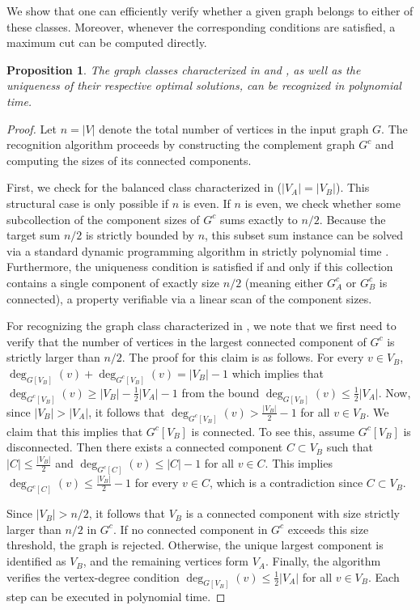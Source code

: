 \documentclass[a4paper,fleqn]{cas-sc}
\newcommand{\1}{\mathbf{1}}
\newtheorem{proposition}[theorem]{Proposition}
\begin{document}
We show that one can efficiently verify whether a given graph belongs to either of these classes. Moreover, whenever the corresponding conditions are satisfied, a maximum cut can be computed directly.


\begin{proposition}
The graph classes characterized in  and , as well as the uniqueness of their respective optimal solutions, can be recognized in polynomial time.
\end{proposition}

\begin{proof}
Let $n = |V|$ denote the total number of vertices in the input graph $G$. The recognition algorithm proceeds by constructing the complement graph $G^c$ and computing the sizes of its connected components.

First, we check for the balanced class characterized in  ($|V_A| = |V_B|$). This structural case is only possible if $n$ is even. If $n$ is even, we check whether some subcollection of the component sizes of $G^c$ sums exactly to $n/2$. Because the target sum $n/2$ is strictly bounded by $n$, this subset sum instance can be solved via a standard dynamic programming algorithm in strictly polynomial time \cite{MIT6006Lec18}. Furthermore, the uniqueness condition is satisfied if and only if this collection contains a single component of exactly size $n/2$ (meaning either $G_A^c$ or $G_B^c$ is connected), a property verifiable via a linear scan of the component sizes.

For recognizing the graph class characterized in , we note that we first need to verify that the number of vertices in the largest connected component of $G^c$ is strictly larger than $n/2$. The proof for this claim is as follows. For every $v \in V_B$, $\deg_{G[V_B]}(v) + \deg_{G^c[V_B]}(v) = |V_B| - 1$ which implies that $\deg_{G^c[V_B]}(v) \geq |V_B|- \frac{1}{2}|V_A|- 1$ from the bound $\deg_{G[V_B]} (v) \leq \tfrac{1}{2}|V_A|$. Now, since $|V_B| > |V_A|$, it follows that $ \deg_{G^c[V_B]}(v) > \frac{|V_B|}{2}-1$ for all $v \in V_B$. We claim that this implies that $G^c[V_B]$ is connected. To see this, assume $G^c[V_B]$ is disconnected. Then there exists a connected component $C \subset V_B$ such that $|C| \leq \frac{|V_B|}{2}$ and $\deg_{G^c[C]} (v) \leq |C| -1$ for all $v \in C$. This implies $\deg_{G^c[C]}(v) \leq \frac{|V_B|}{2}-1$ for every $v \in C$, which is a contradiction since $C \subset V_B$. 

Since $|V_B| > n/2$, it follows that $V_B$ is a connected component with size strictly larger than $n/2$ in $G^c$. If no connected component in $G^c$ exceeds this size threshold, the graph is rejected. Otherwise, the unique largest component is identified as $V_B$, and the remaining vertices form $V_A$. Finally, the algorithm verifies the vertex-degree condition $\deg_{G[V_B]}(v) \le \frac{1}{2}|V_A|$ for all $v \in V_B$. Each step can be executed in polynomial time.
\end{proof}
\end{document}
